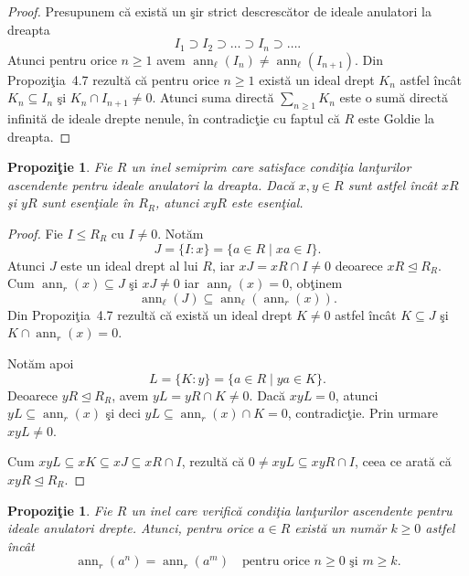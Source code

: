 \documentclass[12pt,a4paper]{book}
\theoremstyle{plain}
\newtheorem{proposition}[theorem]{Propoziţie}
\theoremstyle{definition}
\theoremstyle{remark}
\begin{document}
\begin{proof}
Presupunem că există un şir strict descrescător de ideale anulatori la dreapta
\[
  I_1 \supset I_2 \supset \dots \supset I_n \supset \dots .
\]
Atunci pentru orice \(n \geq 1\) avem
\(\operatorname{ann}_\ell(I_n) \neq \operatorname{ann}_\ell(I_{n+1})\).
Din Propoziţia~4.7 rezultă că pentru orice \(n \geq 1\) există un ideal drept
\(K_n\) astfel încât \(K_n \subseteq I_n\) şi \(K_n \cap I_{n+1} \neq 0\).
Atunci suma directă \(\sum_{n \geq 1} K_n\) este o sumă directă infinită
de ideale drepte nenule, în contradicţie cu faptul că \(R\) este Goldie
la dreapta.
\end{proof}

\begin{proposition}
Fie \(R\) un inel semiprim care satisface condiţia lanţurilor ascendente
pentru ideale anulatori la dreapta.
Dacă \(x, y \in R\) sunt astfel încât \(xR\) şi \(yR\) sunt esenţiale în \(R_R\),
atunci \(xyR\) este esenţial.
\end{proposition}

\begin{proof}
Fie \(I \leq R_R\) cu \(I \neq 0\).
Notăm
\[
  J = \{ I : x \} = \{ a \in R \mid xa \in I \}.
\]
Atunci \(J\) este un ideal drept al lui \(R\), iar
\(xJ = xR \cap I \neq 0\) deoarece \(xR \unlhd R_R\).
Cum \(\operatorname{ann}_r(x) \subseteq J\) şi \(xJ \neq 0\) iar
\(\operatorname{ann}_\ell(x) = 0\), obţinem
\[
  \operatorname{ann}_\ell(J) \subseteq \operatorname{ann}_\ell(\operatorname{ann}_r(x)).
\]
Din Propoziţia~4.7 rezultă că există un ideal drept \(K \neq 0\) astfel încât
\(K \subseteq J\) şi \(K \cap \operatorname{ann}_r(x) = 0\).

Notăm apoi
\[
  L = \{ K : y \} = \{ a \in R \mid ya \in K \}.
\]
Deoarece \(yR \unlhd R_R\), avem \(yL = yR \cap K \neq 0\).
Dacă \(xyL = 0\), atunci \(yL \subseteq \operatorname{ann}_r(x)\) şi deci
\(yL \subseteq \operatorname{ann}_r(x) \cap K = 0\), contradicţie.
Prin urmare \(xyL \neq 0\).

Cum \(xyL \subseteq xK \subseteq xJ \subseteq xR \cap I\), rezultă că
\(0 \neq xyL \subseteq xyR \cap I\), ceea ce arată că \(xyR \unlhd R_R\).
\end{proof}


\begin{proposition}
Fie \(R\) un inel care verifică condiţia lanţurilor ascendente pentru
ideale anulatori drepte.
Atunci, pentru orice \(a \in R\) există un număr \(k \geq 0\) astfel încât
\[
  \operatorname{ann}_r(a^n) = \operatorname{ann}_r(a^m)
  \quad \text{pentru orice } n \geq 0 \text{ şi } m \geq k .
\]
\end{proposition}
\end{document}
